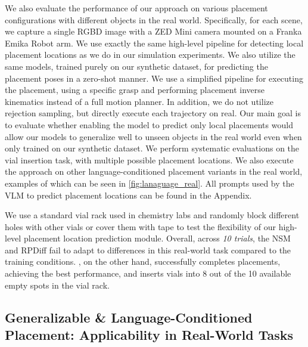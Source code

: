 We also evaluate the performance of our approach on various placement configurations with different objects in the real world. Specifically, for each scene, we capture a single RGBD image with a ZED Mini camera mounted on a Franka Emika Robot arm. We use exactly the same high-level pipeline for detecting local placement locations as we do in our simulation experiments. We also utilize the same models, trained purely on our synthetic dataset, for predicting the placement poses in a zero-shot manner. We use a simplified pipeline for executing the placement, using a specific grasp and performing placement inverse kinematics instead of a full motion planner. In addition, we do not utilize rejection sampling, but directly execute each trajectory on real. Our main goal is to evaluate whether enabling the model to predict only local placements would allow our models to generalize well to unseen objects in the real world even when only trained on our synthetic dataset. We perform systematic evaluations on the vial insertion task, with multiple possible placement locations. We also execute the approach on other language-conditioned placement variants in the real world, examples of which can be seen in \autoref{fig:lanaguage_real}. All prompts used by the VLM to predict placement locations can be found in the Appendix.

We use a standard vial rack used in chemistry labs and randomly block different holes with other vials or cover them with tape to test the flexibility of our high-level placement location prediction module. Overall, across \textit{10 trials}, the NSM and RPDiff fail to adapt to differences in this real-world task compared to the training conditions. \ourmethod, on the other hand, successfully completes placements, achieving the best performance, and inserts vials into 8 out of the 10 available empty spots in the vial rack.

\subsection{\textbf{Generalizable \& Language-Conditioned Placement: Applicability in Real-World Tasks}}

